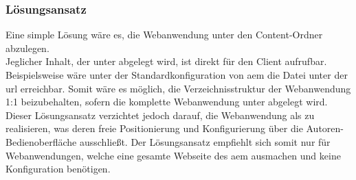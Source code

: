 \subsubsection{Lösungsansatz }
\label{sec:sol_content}
Eine simple Lösung wäre es, die Webanwendung unter den Content-Ordner  abzulegen. \\
Jeglicher Inhalt, der unter  abgelegt wird, ist direkt für den Client aufrufbar. Beispielsweise wäre unter der Standardkonfiguration von \ac{aem} die Datei  unter der \ac{url}  erreichbar. Somit wäre es möglich, die Verzeichnisstruktur der Webanwendung 1:1 beizubehalten, sofern die komplette Webanwendung unter  abgelegt wird. Dieser Lösungsansatz verzichtet jedoch darauf, die Webanwendung als \ajc zu realisieren, was deren freie Positionierung und Konfigurierung über die Autoren-Bedienoberfläche ausschließt. Der Lösungsansatz  empfiehlt sich somit nur für Webanwendungen, welche eine gesamte Webseite des \ac{aem} ausmachen und keine Konfiguration benötigen. 

 